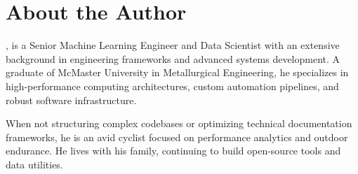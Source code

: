 \chapter*{About the Author}
\thispagestyle{plain}

\authorname, is a Senior Machine Learning Engineer and Data Scientist with an extensive background in engineering frameworks and advanced systems development. A graduate of McMaster University in Metallurgical Engineering, he specializes in high-performance computing architectures, custom automation pipelines, and robust software infrastructure.

When not structuring complex codebases or optimizing technical documentation frameworks, he is an avid cyclist focused on performance analytics and outdoor endurance. He lives with his family, continuing to build open-source tools and data utilities.
